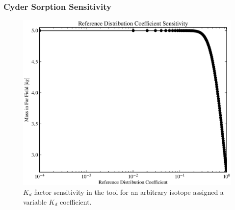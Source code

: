 
\begin{frame}[ctb!]
\frametitle{Cyder Sorption Sensitivity}
\begin{figure}[ht]
\centering
\includegraphics[width=0.7\linewidth]{./nuclide_demonstration/kd.eps}
\caption{$K_d$ factor sensitivity in the \Cyder tool for an arbitrary isotope 
assigned a variable $K_d$ coefficient.} 
\label{fig:kd_result}
\end{figure}
\end{frame}
